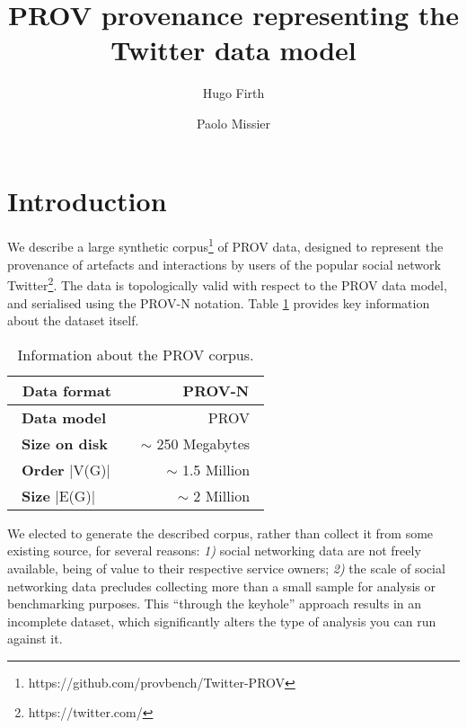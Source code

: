 \documentclass{llncs2e/llncs}
\title{PROV provenance representing the Twitter data model}
\author{Hugo Firth \and Paolo Missier}
\institute{School of Computing Science, Newcastle University, UK\\
           \{h.firth, paolo.missier\}@ncl.ac.uk
}
\begin{document}
\maketitle

\section{Introduction}
%
We describe a large synthetic corpus\footnote{https://github.com/provbench/Twitter-PROV} of PROV data, designed to represent the provenance of artefacts and interactions by users of the popular social network Twitter\footnote{https://twitter.com/}.
%
The data is topologically valid with respect to the PROV data model\cite{PROV-DM}, and serialised using the PROV-N notation\cite{PROV-N}.
%
Table \ref{table:corpus-information} provides key information about the dataset itself.
%    
\begin{table}[H]
    \centering
    \label{table:corpus-information}
    \caption{Information about the PROV corpus.}
    \begin{tabular}{ | l | r | }
        \hline
        \, \textbf{Data format} \, &\, PROV-N \, \\ \hline
        \, \textbf{Data model} \, &\, PROV \, \\ \hline
        \, \textbf{Size on disk} \, &\, $\sim$ 250 Megabytes \, \\ \hline
        \, \textbf{Order} $\vert$V(G)$\vert$ \, &\, $\sim$ 1.5 Million \, \\ \hline
        \, \textbf{Size} $\vert$E(G)$\vert$ \, &\, $\sim$ 2 Million \, \\ \hline
    \end{tabular}
\end{table}
%
We elected to generate the described corpus, rather than collect it from some existing source, for several reasons:
%
\textit{1)} social networking data are not freely available, being of value to their respective service owners;
%
\textit{2)} the scale of social networking data precludes collecting more than a small sample for analysis or benchmarking purposes.
%
This ``through the keyhole'' approach results in an incomplete dataset, which significantly alters the type of analysis you can run against it.
% 
\end{document}
